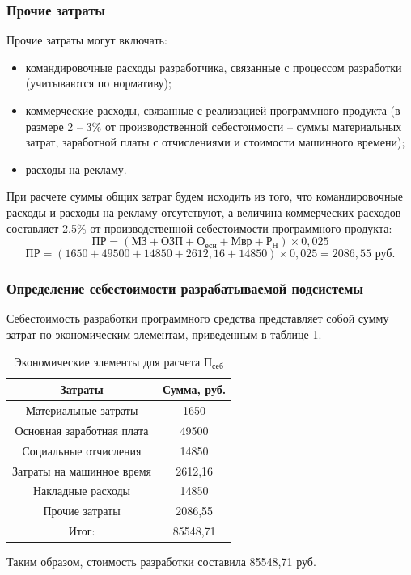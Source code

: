 \documentclass[a4paper]{extarticle}
\numberwithin{equation}{section}
\begin{document}
\subsubsection{Прочие затраты}
Прочие затраты могут включать:
\begin{itemize}
\item командировочные расходы разработчика, связанные с процессом разработки (учитываются по нормативу);
\item коммерческие расходы, связанные с реализацией программного продукта (в размере 2 – 3\% от производственной себестоимости – суммы материальных затрат, заработной платы с отчислениями и стоимости машинного времени);
\item расходы на рекламу.
\end{itemize}\par
При расчете суммы общих затрат будем исходить из того, что командировочные расходы и расходы на рекламу отсутствуют, а величина коммерческих расходов составляет 2,5\% от производственной себестоимости программного продукта:
\begin{equation}
\label{form13}
	\text{ПР}=(\text{МЗ}+\text{ОЗП}+\text{О}_\text{есн}+\text{Мвр}+\text{Р}_\text{Н})\times 0,025
\end{equation}
$$\text{ПР}=(1650+49500+14850+2612,16+14850)\times 0,025=2086,55\text{ руб.}$$

\subsubsection{Определение себестоимости разрабатываемой подсистемы}
Себестоимость разработки программного средства представляет собой сумму затрат по экономическим элементам, приведенным в таблице 1.\par
\begin{table}[H]
\caption{Экономические элементы для расчета $\text{П}_\text{себ}$}
  \begin{tabular}{|c|c|}
  \hline
  Затраты & Сумма, руб. \\\hline
  Материальные затраты & 1650 \\\hline
  Основная заработная плата & 49500 \\\hline
  Социальные отчисления & 14850 \\\hline
  Затраты на машинное время & 2612,16 \\\hline
  Накладные расходы & 14850 \\\hline
  Прочие затраты & 2086,55 \\\hline
  Итог: & 85548,71 \\
  \hline
  \end{tabular}
\end{table}\par
Таким образом, стоимость разработки составила 85548,71 руб.\par
\end{document}
